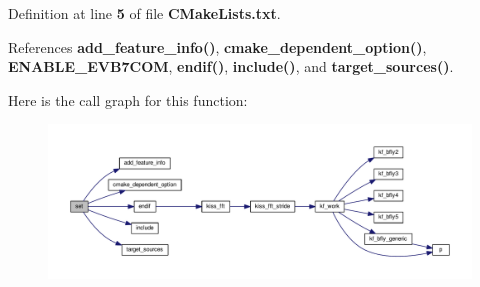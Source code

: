 Definition at line {\bf 5} of file {\bf C\+Make\+Lists.\+txt}.



References {\bf add\+\_\+feature\+\_\+info()}, {\bf cmake\+\_\+dependent\+\_\+option()}, {\bf E\+N\+A\+B\+L\+E\+\_\+\+E\+V\+B7\+C\+OM}, {\bf endif()}, {\bf include()}, and {\bf target\+\_\+sources()}.



Here is the call graph for this function\+:
\nopagebreak
\begin{figure}[H]
\begin{center}
\leavevmode
\includegraphics[width=350pt]{d5/d4a/limesuite-dev_2src_2ConnectionEVB7COM_2CMakeLists_8txt_ab81495574c55acc50d90940f5348debf_cgraph}
\end{center}
\end{figure}


